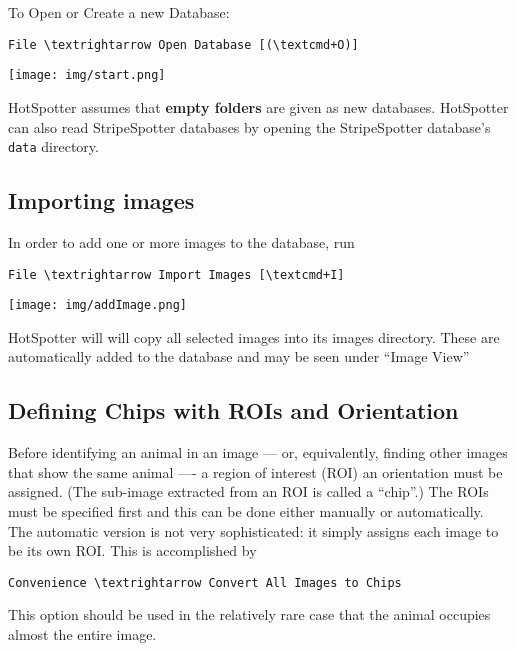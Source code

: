 \documentclass[a4paper,10pt]{article}
\begin{document}
    To Open or Create a new Database: \\
    \begin{Verbatim}[commandchars=\\\{\}]
    File \textrightarrow Open Database [(\textcmd+O)]
    \end{Verbatim}

    \begin{center}
        \texttt{[image: img/start.png]}
    \end{center}

    HotSpotter assumes that \textbf{empty folders} are given as new databases.
    HotSpotter can also read StripeSpotter databases by opening the
    StripeSpotter database's {\tt data} directory.
    
    \subsection{Importing images}
        In order to add one or more images to the database, run
        \begin{Verbatim}[commandchars=\\\{\}]
        File \textrightarrow Import Images [\textcmd+I] 
        \end{Verbatim}
        \begin{center}
            \texttt{[image: img/addImage.png]}
        \end{center}
        HotSpotter will will copy all selected images into its images directory.
        These are automatically added to the database and may be seen under ``Image View''

    \subsection{Defining Chips with ROIs and Orientation}
        Before identifying an animal in an image --- or, equivalently,
        finding other images that show the same animal ---- a region
        of interest (ROI) an orientation must be assigned.  (The
        sub-image extracted from an ROI is called a ``chip''.)  The
        ROIs must be specified first and this can be done either
        manually or automatically.  The automatic version is not very
        sophisticated: it simply assigns each image to be its own ROI.
        This is accomplished by
        \begin{Verbatim}[commandchars=\\\{\}]
        Convenience \textrightarrow Convert All Images to Chips
        \end{Verbatim}
        This option should be used in the relatively rare case that the
        animal occupies almost the entire image.
\end{document}
